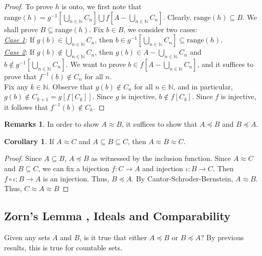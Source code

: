 \documentclass[14pt]{article}
\theoremstyle{definition}
\newtheorem*{remark}{Remarks}
\newtheorem{coro}[definition]{Corollary}
\newcommand{\fun}[3]{#1\colon #2\rightarrow#3}
\newcommand{\bb}[1]{\mathbb{#1}}
\begin{document}
\begin{proof}
    To prove $h$ is onto, we first note that $\mathrm{range}(h)=
    g^{-1}[\bigcup_{n\in\bb{N}} C_n]\bigcup f[A-\bigcup_{n\in\bb{N}} C_n]$. Clearly,
    $\mathrm{range}(h)\subseteq B$. We shall prove $B\subseteq \mathrm{range}(h)$.
    Fix $b\in B$, we consider two cases:\\
    \textit{\underline{Case 1}}: If $g(b)\in \bigcup_{n\in\bb{N}}C_n$, then 
    $b\in  g^{-1}[\bigcup_{n\in\bb{N}} C_n]\subseteq \mathrm{range}(h)$.\\
    \textit{\underline{Case 2}}: If $g(b)\not\in \bigcup_{n\in\bb{N}}C_n$, then 
    $g(b)\in A-\bigcup_{n\in\bb{N}} C_n$ and $b\not\in g^{-1}[\bigcup_{n\in\bb{N}} C_n]$.
    We want to prove $b\in f[A-\bigcup_{n\in\bb{N}} C_n]$, and it suffices to prove that 
    $f^{-1}(b)\not\in C_n$ for all $n$. \\
    Fix any $k\in\bb{N}$. Observe that $g(b)\not\in C_n$ for all $n\in\bb{N}$, and in particular, 
    $g(b)\not\in C_{k+1}=g[f[C_k]]$. Since $g$ is injective,
    $b\not\in f[C_k]$. Since $f$ is injective,
    it follows that $f^{-1}(b)\not\in C_k$.


    
    

\end{proof}


\begin{remark}
    In order to show $A\approx B$, it suffices to show that $A\preceq B$ and $B\preceq A$.
\end{remark}

\vspace{2mm}

\begin{coro}
If $A\approx C$ and $A\subseteq B\subseteq C$, then $A\approx B\approx C$.
\end{coro}

\begin{proof}
    Since $A\subseteq B $, $A\preceq B$ as witnessed by the inclusion function.
    Since $A\approx C$ and $B\subseteq C$, we can fix a bijection $\fun{f}{C}{A}$
    and injection $\fun{\iota}{B}{C}$. Then $f\circ \iota\colon B\rightarrow A$ is an injection.
    Thus, $B\preceq A$. By  Cantor-Schroder-Bernstein, $A\approx B$. Thus, $C\approx A\approx B$
\end{proof}

\vspace{5mm}

\subsection{Zorn's Lemma , Ideals and Comparability}
Given any sets $A$ and $B$, is it true that either $A\preceq B$ or $B\preceq A$? By previous results,
this is true for countable sets.
\end{document}
